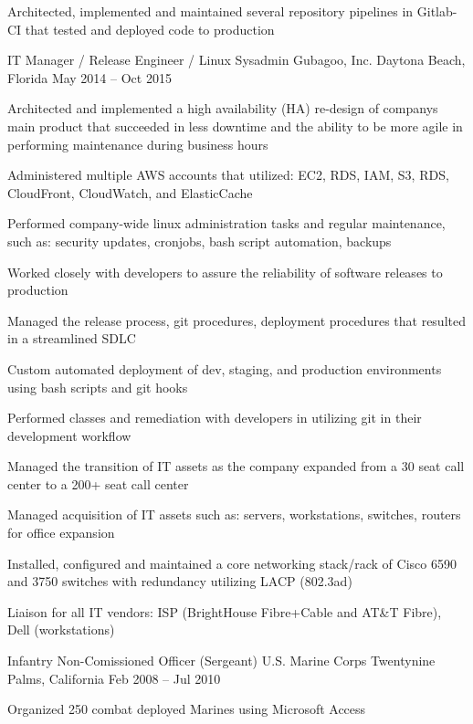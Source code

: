 \begin{cventries}
{\begin{cvitems}
		\item {Architected, implemented and maintained several repository pipelines in Gitlab-CI that tested and deployed code to production}
		\end{cvitems}}
	\cventry
	{IT Manager / Release Engineer / Linux Sysadmin}
	{Gubagoo, Inc.}
	{Daytona Beach, Florida}
	{May 2014 – Oct 2015}
	{\begin{cvitems}
		\item {Architected and implemented a high availability (HA) re-design of company\textquotesingle{}s main product that succeeded in less downtime and the ability to be more agile in performing maintenance during business hours}
		\item {Administered multiple AWS accounts that utilized: EC2, RDS, IAM, S3, RDS, CloudFront, CloudWatch, and ElasticCache}
		\item {Performed company-wide linux administration tasks and regular maintenance, such as: security updates, cronjobs, bash script automation, backups}
		\item {Worked closely with developers to assure the reliability of software releases to production}
		\item {Managed the release process, git procedures, deployment procedures that resulted in a streamlined SDLC}
		\item {Custom automated deployment of dev, staging, and production environments using bash scripts and git hooks}
		\item {Performed classes and remediation with developers in utilizing git in their development workflow}
		\item {Managed the transition of IT assets as the company expanded from a 30 seat call center to a 200+ seat call center}
		\item {Managed acquisition of IT assets such as: servers, workstations, switches, routers for office expansion}
		\item {Installed, configured and maintained a core networking stack/rack of Cisco 6590 and 3750 switches with redundancy utilizing LACP (802.3ad)}
		\item {Liaison for all IT vendors: ISP (BrightHouse Fibre+Cable and AT\&T Fibre), Dell (workstations)}
		\end{cvitems}}
	\cventry
	{Infantry Non-Comissioned Officer (Sergeant)}
	{U.S. Marine Corps}
	{Twentynine Palms, California}
	{Feb 2008 – Jul 2010}
	{\begin{cvitems}
		\item {Organized 250 combat deployed Marines using Microsoft Access}

\end{cvitems}}
\end{cventries}
